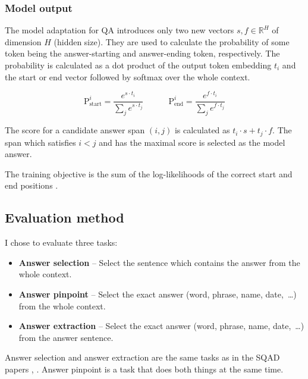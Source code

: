 \documentclass[
  printed, %
  color,   %
  table,   %
  oneside, %
  lof,     %
  lot,     %
]{fithesis3}
\begin{document}
\subsubsection{Model output}
The model adaptation for QA introduces only two new vectors \linebreak $s, f \in \mathbb{R}^H$ of dimension $H$ (hidden size). They are used to calculate the probability of some token being the answer-starting and answer-ending token, respectively. The probability is calculated as a dot product of the output token embedding $t_i$ and the start or end vector followed by softmax over the whole context.

\vspace{-2em}
{\Large$$
\text{P}_\text{start}^i = \frac{e^{s \cdot t_i}}{\sum_j e^{s \cdot t_j}} 
\hspace{3em}
\text{P}_\text{end}^i = \frac{e^{f \cdot t_i}}{\sum_j e^{f \cdot t_j}}
$$}
\vspace{-1em}

The score for a candidate answer span $(i, j)$ is calculated as \linebreak $t_i \cdot s + t_j \cdot f$. The span which satisfies $i < j$ and has the maximal score is selected as the model answer.

The training objective is the sum of the log-likelihoods of the correct start and end positions \parencite[section 4.2]{bert}.

\subsection{Evaluation method}

\begin{samepage}
I chose to evaluate three tasks:
\begin{itemize}
    \itemsep-0.3em 
    \item \textbf{Answer selection} -- Select the sentence which contains the answer from the whole context. 
    \item \textbf{Answer pinpoint} -- Select the exact answer (word, phrase, name, date,~\dots) from the whole context.
    \item \textbf{Answer extraction} -- Select the exact answer (word, phrase, name, date,~\dots) from the answer sentence.
\end{itemize}
\end{samepage}

Answer selection and answer extraction are the same tasks as in the SQAD papers \parencite{sqad}, \parencite{sqadv1}. Answer pinpoint is a task that does both things at the same time.
\end{document}
